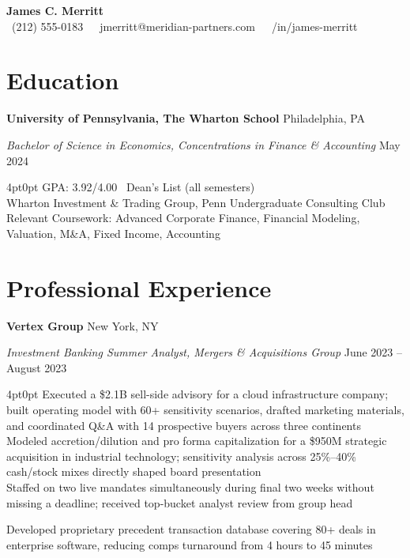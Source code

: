 \documentclass[10pt,letterpaper]{article}
\newcommand{\cvheader}[4]{%
  \begin{center}
    {\fontsize{22pt}{26pt}\selectfont\bfseries\color{cvblack}#1}\\[3pt]
    {\footnotesize\color{cvgray} #2 \,\textbar\, #3 \,\textbar\, #4}
  \end{center}
  \vspace{-4pt}
}
\newcommand{\cvitem}[2]{%
  \textbf{#1} \hfill {\footnotesize\color{cvgray}#2}\par
}
\newcommand{\cvsubitem}[2]{%
  {\footnotesize\textit{#1}} \hfill {\footnotesize\color{cvgray}#2}\par
}
\newcommand{\cvbullet}[1]{%
  \hspace{4pt}{\footnotesize\color{cvrule}$\bullet$} {\small#1}\par
}
\newcommand{\cvbulletkern}[1]{%
  \hspace{4pt}{\footnotesize\color{cvrule}$\bullet$} {\small#1}\\[0.5pt]
}
\begin{document}
\pagestyle{empty}

\cvheader{James C. Merritt}
  {\faPhone\  (212) 555-0183}
  {\faEnvelope\  jmerritt@meridian-partners.com}
  {\faLinkedinIn\  /in/james-merritt}

\section{Education}

\cvitem{University of Pennsylvania, The Wharton School}{Philadelphia, PA}
\cvsubitem{Bachelor of Science in Economics, Concentrations in Finance \& Accounting}{May 2024}

\begin{adjustwidth}{4pt}{0pt}
\cvbulletkern{GPA: 3.92/4.00 \textbar\ Dean's List (all semesters)}
\cvbulletkern{Wharton Investment \& Trading Group, Penn Undergraduate Consulting Club}
\cvbulletkern{Relevant Coursework: Advanced Corporate Finance, Financial Modeling, Valuation, M\&A, Fixed Income, Accounting}
\end{adjustwidth}

\section{Professional Experience}

\cvitem{Vertex Group}{New York, NY}
\cvsubitem{Investment Banking Summer Analyst, Mergers \& Acquisitions Group}{June 2023 -- August 2023}

\begin{adjustwidth}{4pt}{0pt}
\cvbulletkern{Executed a \$2.1B sell-side advisory for a cloud infrastructure company; built operating model with 60+ sensitivity scenarios, drafted marketing materials, and coordinated Q\&A with 14 prospective buyers across three continents}
\cvbulletkern{Modeled accretion/dilution and pro forma capitalization for a \$950M strategic acquisition in industrial technology; sensitivity analysis across 25\%--40\% cash/stock mixes directly shaped board presentation}
\cvbullet{Staffed on two live mandates simultaneously during final two weeks without missing a deadline; received top-bucket analyst review from group head}
\cvbullet{Developed proprietary precedent transaction database covering 80+ deals in enterprise software, reducing comps turnaround from 4 hours to 45 minutes}
\end{adjustwidth}
\end{document}
